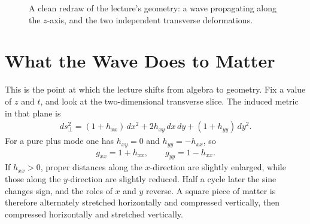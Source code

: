 \begin{figure}[t]
\centering
{}
\caption{A clean redraw of the lecture's geometry: a wave propagating along the \(z\)-axis, and the two independent transverse deformations.}
\end{figure}

\section{What the Wave Does to Matter}

This is the point at which the lecture shifts from algebra to geometry. Fix a value of \(z\) and \(t\), and look at the two-dimensional transverse slice. The induced metric in that plane is
\begin{align}
ds_{\perp}^{2}
=
(1+h_{xx})\,dx^{2}
+
2h_{xy}\,dx\,dy
+
(1+h_{yy})\,dy^{2}.
\end{align}
For a pure plus mode one has \(h_{xy}=0\) and \(h_{yy}=-h_{xx}\), so
\begin{align}
g_{xx}=1+h_{xx},
\qquad
g_{yy}=1-h_{xx}.
\end{align}
If \(h_{xx}>0\), proper distances along the \(x\)-direction are slightly enlarged, while those along the \(y\)-direction are slightly reduced. Half a cycle later the sine changes sign, and the roles of \(x\) and \(y\) reverse. A square piece of matter is therefore alternately stretched horizontally and compressed vertically, then compressed horizontally and stretched vertically.

